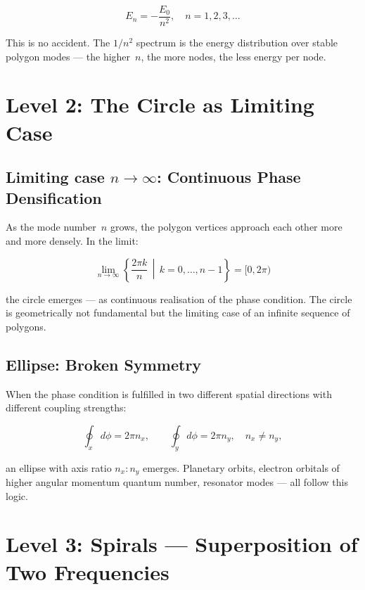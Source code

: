 \begin{equation}
  E_n = -\frac{E_0}{n^2}, \quad n = 1, 2, 3, \ldots
\end{equation}

This is no accident. The $1/n^2$ spectrum is the energy distribution
over stable polygon modes — the higher~$n$, the more nodes, the less
energy per node.

\section{Level 2: The Circle as Limiting Case}

\subsection{Limiting case \texorpdfstring{$n \to \infty$}{n to infinity}: Continuous Phase Densification}

As the mode number~$n$ grows, the polygon vertices approach each
other more and more densely. In the limit:

\begin{equation}
  \lim_{n \to \infty} \left\{ \frac{2\pi k}{n} \,\middle|\,
  k = 0,\ldots,n-1 \right\} = [0, 2\pi)
\end{equation}

the circle emerges — as continuous realisation of the phase condition.
The circle is geometrically not fundamental but the limiting case of
an infinite sequence of polygons.

\subsection{Ellipse: Broken Symmetry}

When the phase condition is fulfilled in two different spatial
directions with different coupling strengths:

\begin{equation}
  \oint_x d\phi = 2\pi n_x, \qquad
  \oint_y d\phi = 2\pi n_y, \quad n_x \neq n_y,
\end{equation}

an ellipse with axis ratio $n_x : n_y$ emerges. Planetary orbits,
electron orbitals of higher angular momentum quantum number,
resonator modes — all follow this logic.

\section{Level 3: Spirals — Superposition of Two Frequencies}


